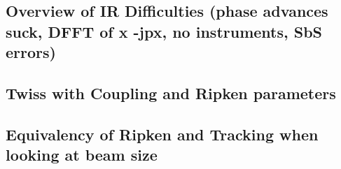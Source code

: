 \subsection{Overview of IR Difficulties (phase advances suck, DFFT of x -jpx, no instruments, SbS errors)}

\subsection{Twiss with Coupling and Ripken parameters}

\subsection{Equivalency of Ripken and Tracking when looking at beam size}









